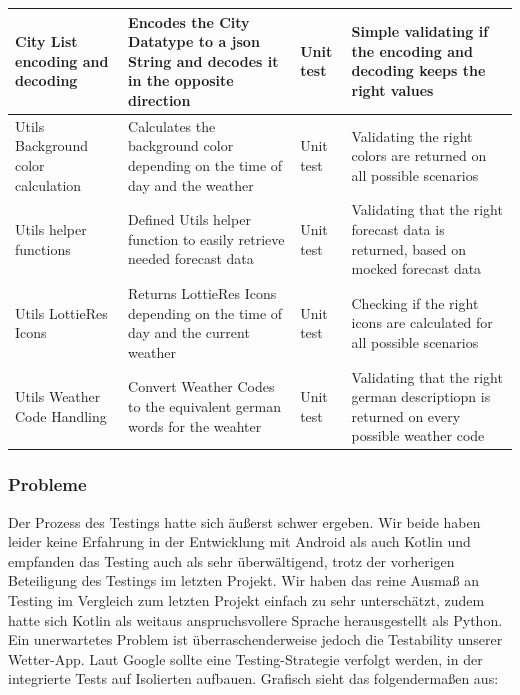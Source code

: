 \documentclass{article}
\begin{document}
\begin{center}
\begin{tabularx}{\textwidth}{|X|l|X|l|}
    \hline
    City List encoding and decoding & Encodes the City Datatype to a json String and decodes it in the opposite direction & Unit test & Simple validating if the encoding and decoding keeps the right values  \\
    \hline
    Utils Background color calculation & Calculates the background color depending on the time of day and the weather & Unit test & Validating the right colors are returned on all possible scenarios  \\
    \hline
    Utils helper functions & Defined Utils helper function to easily retrieve needed forecast data & Unit test & Validating that the right forecast data is returned, based on mocked forecast data  \\
    \hline
    Utils LottieRes Icons & Returns LottieRes Icons depending on the time of day and the current weather & Unit test & Checking if the right icons are calculated for all possible scenarios  \\
    \hline
    Utils Weather Code Handling & Convert Weather Codes to the equivalent german words for the weahter & Unit test & Validating that the right german descriptiopn is returned on every possible weather code  \\
    \hline
    
  \end{tabularx}
\end{center}

\subsubsection{Probleme}

Der Prozess des Testings hatte sich äußerst schwer ergeben. Wir beide haben leider keine Erfahrung in der Entwicklung mit Android als auch Kotlin und empfanden das Testing auch als sehr überwältigend, trotz der vorherigen Beteiligung des Testings im letzten Projekt. Wir haben das reine Ausmaß an Testing im Vergleich zum letzten Projekt einfach zu sehr unterschätzt, zudem hatte sich Kotlin als weitaus anspruchsvollere Sprache herausgestellt als Python. Ein unerwartetes Problem ist überraschenderweise jedoch die Testability unserer Wetter-App. Laut Google sollte eine Testing-Strategie verfolgt werden, in der integrierte Tests auf Isolierten aufbauen. Grafisch sieht das folgendermaßen aus:
\end{document}
